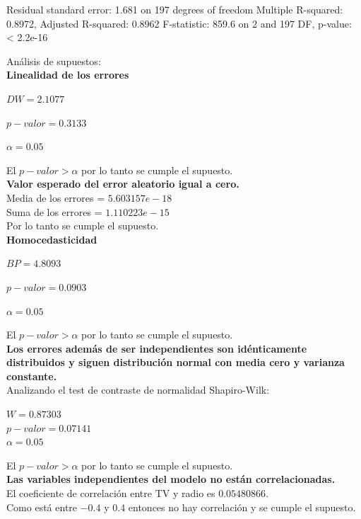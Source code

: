 \documentclass[12pt,a4paper]{article}
\begin{document}
	Residual standard error: 1.681 on 197 degrees of freedom
	Multiple R-squared:  0.8972,	Adjusted R-squared:  0.8962 
	F-statistic: 859.6 on 2 and 197 DF,  p-value: < 2.2e-16
	
	Análisis de supuestos:\\
	
	\textbf{Linealidad de los errores}
	\begin{center}
		$DW = 2.1077$
		
		$p-valor = 0.3133$
		
		$\alpha = 0.05$
	\end{center}
	El $p-valor > \alpha$ por lo tanto se cumple el supuesto.\\
	
	\textbf{Valor esperado del error aleatorio igual a cero.}\\
	Media de los errores = $5.603157e-18$\\
	Suma de los errores = $1.110223e-15$\\
	Por lo tanto se cumple el supuesto.\\
	
	\textbf{Homocedasticidad}\\
	\begin{center}
		$BP = 4.8093$
		
		$p-valor = 0.0903$
		
		$\alpha = 0.05$
	\end{center}
	El $p-valor > \alpha$ por lo tanto se cumple el supuesto.\\
	
	\textbf{Los errores además de ser independientes son idénticamente distribuidos y siguen distribución normal con media cero y varianza constante.}\\
	Analizando el test de contraste de normalidad Shapiro-Wilk:
	\begin{center}
		$W = 0.87303$ \\
		$p-valor = 0.07141$\\
		$\alpha = 0.05$
	\end{center}
	El $p-valor > \alpha$ por lo tanto se cumple el supuesto.\\
	
	\textbf{Las variables independientes del modelo no están correlacionadas.}\\
	El coeficiente de correlación entre TV y radio es $0.05480866$.\\
	Como está entre $-0.4$ y $0.4$ entonces no hay correlación y se cumple el supuesto.\\
	
\end{document}

